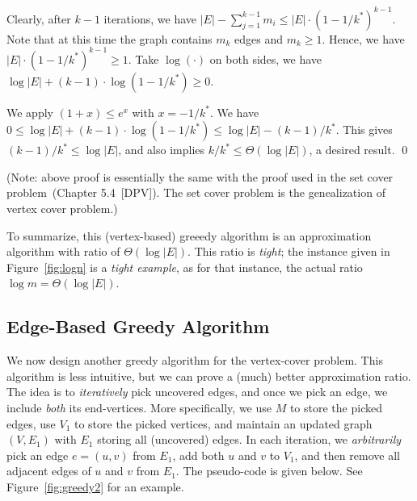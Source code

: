 Clearly, after $k-1$ iterations, 
we have $|E| - \sum_{j=1}^{k-1} m_i \le |E| \cdot (1-1/k^*)^{k-1}$.
Note that at this time the graph contains $m_k$ edges and $m_k \ge 1$.
Hence, we have $|E| \cdot (1-1/k^*)^{k-1} \ge 1$.
Take $\log(\cdot)$ on both sides, we have $\log |E| + (k-1)\cdot \log (1-1/k^*) \ge 0$.

We apply $(1+x)\le e^x$ with $x = -1/k^*$.
We have $0 \le \log |E| + (k-1)\cdot \log (1-1/k^*) \le \log |E| - (k-1)/k^*$.
This gives $(k-1)/k^* \le \log |E|$, and also implies 
$k/k^* \le \Theta(\log |E|)$, a desired result. \qed

(Note: above proof is essentially the same with the proof used in the set cover problem~(Chapter 5.4~[DPV]).
The set cover problem is the genealization of vertex cover problem.)

To summarize, this (vertex-based) greeedy algorithm is an approximation algorithm with ratio of $\Theta(\log |E|)$.
This ratio is \emph{tight}; the instance given in Figure~\ref{fig:logn} is a \emph{tight example},
as for that instance, the actual ratio $\log m = \Theta(\log |E|)$.


\subsection*{Edge-Based Greedy Algorithm}

We now design another greedy algorithm for the vertex-cover problem.
This algorithm is less intuitive, but we can prove a (much) better approximation ratio.
The idea is to \emph{iteratively} pick uncovered edges, and once we pick an edge,
we include \emph{both} its end-vertices.
More specifically, we use $M$ to store the picked edges, use $V_1$ to store the picked vertices,
and maintain an updated graph $(V, E_1)$ with $E_1$ storing all (uncovered) edges. In each iteration,
we \emph{arbitrarily} pick an edge $e=(u,v)$ from $E_1$, add both $u$ and $v$ to $V_1$, 
and then remove all adjacent edges of $u$ and $v$ from $E_1$.
The pseudo-code is given below. See Figure~\ref{fig:greedy2} for an example.

\begin{minipage}{0.8\textwidth}
	\xxx
	\xxx
	\xxx
	\xxx
	\xxx
	\xxx
	\xxx
	\xxx
	\xxx
	\xxx
\end{minipage}


